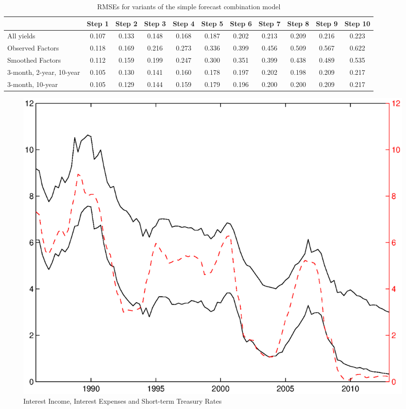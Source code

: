 \documentclass[11pt]{article}
\begin{document}
\newpage \clearpage
\begin{table}
\caption{RMSEs for variants of the simple forecast combination model} \label{table_rmse_combination}
\center
\begin{tabular}{|l|c|c|c|c|c|c|c|c|c|c|}
\hline
&Step 1 &Step 2 &Step 3 &Step 4 &Step 5 &Step 6 &Step 7 &Step 8 &Step 9 &Step 10\\
\hline
All yields              &0.107&0.133&0.148&0.168&0.187&0.202&0.213&0.209&0.216&0.223\\
Observed Factors        &0.118&0.169&0.216&0.273&0.336&0.399&0.456&0.509&0.567&0.622\\
Smoothed Factors        &0.112&0.159&0.199&0.247&0.300&0.351&0.399&0.438&0.489&0.535\\
3-month, 2-year, 10-year&0.105&0.130&0.141&0.160&0.178&0.197&0.202&0.198&0.209&0.217\\
3-month, 10-year        &0.105&0.129&0.144&0.159&0.179&0.196&0.200&0.200&0.209&0.217\\
\hline
\end{tabular}
\end{table}

\newpage \clearpage
\newpage \clearpage
\begin{figure}
\caption{Interest Income, Interest Expenses and Short-term Treasury Rates} \label{figure_nims_components}
\center
\includegraphics[scale=0.85]{figure_nims_components.ps}
\end{figure}
\end{document}

